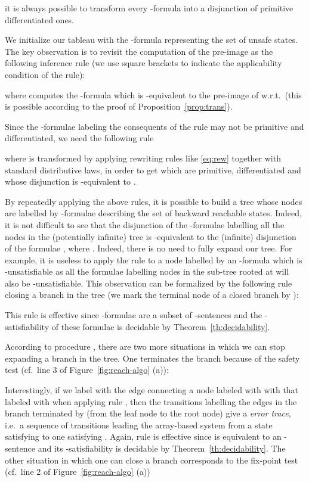 \documentclass{LMCS}
\theoremstyle{plain}\newtheorem{assumption}[thm]{Assumption}
\theoremstyle{plain}\newtheorem{proposition}[thm]{Proposition}
\theoremstyle{plain}\newtheorem{property}[thm]{Property}
\theoremstyle{plain}\newtheorem{example}[thm]{Example}
\theoremstyle{plain}\newtheorem{claim}[thm]{Claim}
\theoremstyle{plain}\newtheorem{lemma}[thm]{Lemma}
\begin{document}
it is always possible to transform every -formula into a
disjunction of primitive differentiated ones.

We initialize our tableau with the -formula 
representing the set of unsafe states.  The key observation is to
revisit the computation of the pre-image as the following inference
rule (we use square brackets to indicate the applicability  condition of the rule):

where  computes the -formula which is
-equivalent to the pre-image of  w.r.t.\  (this is
possible according to the proof of Proposition~\ref{prop:trans}).

Since the -formulae labeling the consequents of the rule
 may not be primitive and differentiated, we need the
following  rule

where  is  transformed  by applying rewriting rules like
\eqref{eq:rew} together with standard distributive laws, in order to
get  which are primitive, differentiated and whose
disjunction is -equivalent to .

By repeatedly applying the above rules, it is possible to build a tree
whose nodes are labelled by -formulae describing the set of
backward reachable states.  Indeed, it is not difficult to see that
the disjunction of the -formulae labelling all the nodes in
the (potentially infinite) tree is -equivalent to
the (infinite) disjunction of the formulae , where .  Indeed, there is
no need to fully expand our tree.  For example, it is useless to apply
the rule  to a node  labelled by an
-formula which is -unsatisfiable as all the formulae
labelling nodes in the sub-tree rooted at  will also be
-unsatisfiable.  This observation can be formalized by the
following rule closing a branch in the tree (we mark the terminal node
of a closed branch by ):

This rule is effective since -formulae are a subset of
-sentences and the -sa\-tis\-fia\-bi\-li\-ty of
these formulae is decidable by Theorem~\ref{th:decidability}.

According to procedure , there are two more
situations in which we can stop expanding a branch in the tree.  One
terminates the branch because of the safety test (cf.\ line 3 of
Figure~\ref{fig:reach-algo} (a)):

Interestingly, if we label with  the edge connecting a node
labeled with  with that labeled with  when applying
rule , then the transitions  labelling the edges in the branch terminated by
 (from the leaf node to the root node) give a
\emph{error trace}, i.e.\ a sequence of transitions leading the
array-based system from a state satisfying  to one satisfying .
Again, rule  is effective since  is
equivalent to an -sentence and its
-satisfiability is decidable by Theorem~\ref{th:decidability}.
The other situation in which one can close a branch corresponds to the
fix-point test (cf.\ line 2 of Figure~\ref{fig:reach-algo} (a))
\end{document}
